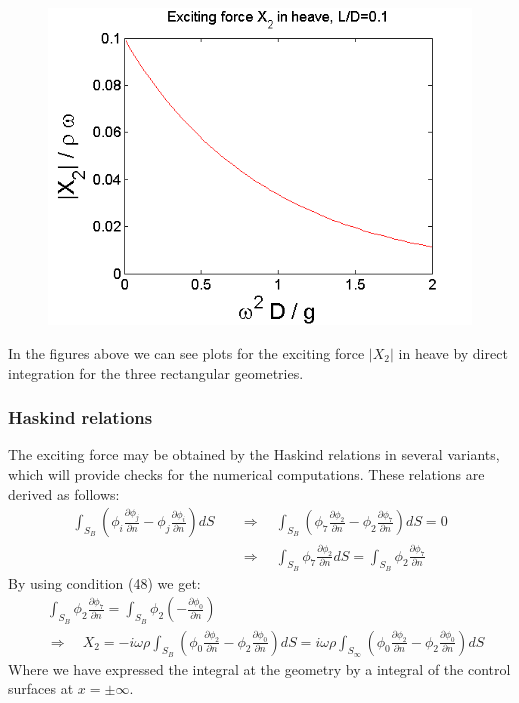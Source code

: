 \documentclass[a4paper,10pt]{article}
\newcommand{\dd}{\partial}
\begin{document}
\begin{figure}[H]
  \caption{}\label{X2_box2}
\endminipage
{}%
  \includegraphics[width=\linewidth]{X2_box3.png}
  \caption{}\label{X2_box3}
\endminipage
\end{figure}

In the figures above we can see plots for the exciting force $\vert X_2 \vert$ in heave by direct integration for the three rectangular geometries.

\subsubsection{Haskind relations}
The exciting force may be obtained by the Haskind relations in several variants, which will provide checks for the numerical computations. These relations are derived as follows:
\begin{align}
\int_{S_B} (\phi_i \frac{\dd \phi_j}{\dd n} - \phi_j \frac{\dd \phi_i}{\dd n}) dS \quad &\Rightarrow \quad \int_{S_B}( \phi_7 \frac{\dd \phi_2}{\dd n} - \phi_2 \frac{\dd \phi_7}{\dd n}) dS = 0 \\
& \Rightarrow \quad \int_{S_B} \phi_7 \frac{\dd \phi_2}{\dd n} dS = \int_{S_B} \phi_2 \frac{\dd \phi_7}{\dd n}
\end{align}
By using condition (48) we get:
\begin{align}
&\int_{S_B} \phi_2 \frac{\dd \phi_7}{\dd n} = \int_{S_B} \phi_2 (- \frac{\dd \phi_0}{\dd n})\\
&\Rightarrow \quad X_2 = - i \omega \rho \int_{S_B} (\phi_0 \frac{\dd \phi_2}{\dd n} - \phi_2 \frac{\dd \phi_0}{\dd n}) dS =  i \omega \rho \int_{S_\infty} (\phi_0 \frac{\dd \phi_2}{\dd n} - \phi_2 \frac{\dd \phi_0}{\dd n}) dS 
\end{align}
Where we have expressed the integral at the geometry by a integral of the control surfaces at $x = \pm \infty$.\\[1 em]
\end{document}
